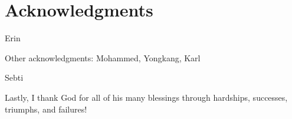 \chapter*{Acknowledgments}
Erin

Other acknowledgments: Mohammed, Yongkang, Karl

Sebti

Lastly, I thank God for all of his many blessings through hardships, successes, triumphs, and failures!

 